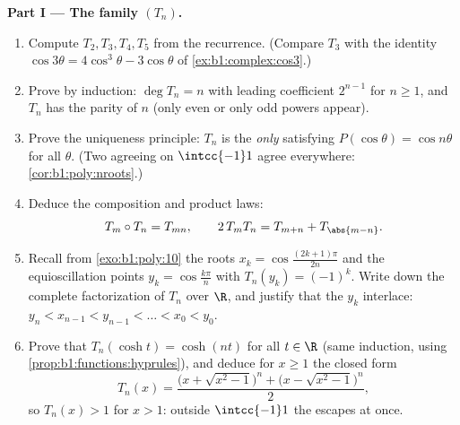 \begin{problem}
\medskip
\noindent\textbf{Part I --- The family $(T_n)$.}
\begin{enumerate}
  \item Compute $T_2, T_3, T_4, T_5$ from the recurrence. (Compare
        $T_3$ with the identity $\cos3\theta = 4\cos^3\theta -
        3\cos\theta$ of \cref{ex:b1:complex:cos3}.)
  \item Prove by induction: $\deg T_n = n$ with leading
        coefficient $2^{n-1}$ for $n \geq 1$, and $T_n$ has the
        parity of $n$ (only even or only odd powers appear).
  \item Prove the uniqueness principle: $T_n$ is the \emph{only}
         satisfying $P(\cos\theta) = \cos n\theta$ for
        all $\theta$. (Two  agreeing on $\intcc{-1}1$
        agree everywhere: \cref{cor:b1:poly:nroots}.)
  \item Deduce the composition and product laws:
        \[
        T_m \circ T_n = T_{mn},
        \qquad
        2\,T_m T_n = T_{m+n} + T_{\abs{m-n}} .
        \]
  \item Recall from \cref{exo:b1:poly:10} the roots $x_k =
        \cos\frac{(2k+1)\pi}{2n}$ and the equioscillation points
        $y_k = \cos\frac{k\pi}n$ with $T_n(y_k) = (-1)^k$. Write
        down the complete factorization of $T_n$ over $\R$, and
        justify that the $y_k$ interlace: $y_n < x_{n-1} < y_{n-1}
        < \dots < x_0 < y_0$.
  \item Prove that $T_n(\cosh t) = \cosh(nt)$ for all $t \in \R$
        (same induction, using
        \cref{prop:b1:functions:hyprules}), and deduce for $x
        \geq 1$ the closed form
        \[
        T_n(x) = \frac{\bigl(x + \sqrt{x^2 - 1}\bigr)^n +
        \bigl(x - \sqrt{x^2 - 1}\bigr)^n}{2} ,
        \]
        so $T_n(x) > 1$ for $x > 1$: outside $\intcc{-1}1$ the
         escapes at once.
\end{enumerate}


\end{problem}

